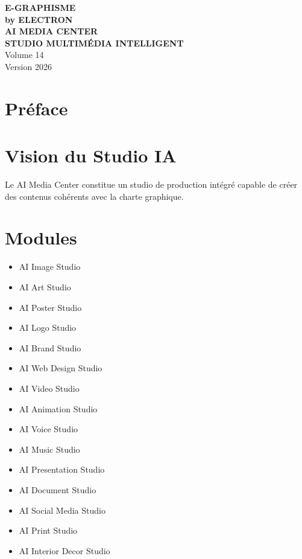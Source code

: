 \documentclass[12pt,a4paper,oneside]{book}
\begin{document}
\begin{titlepage}
\begin{center}
\vspace*{3cm}
{\Huge\bfseries\color{bleuIA}E-GRAPHISME}\\[0.3cm]
{\LARGE\bfseries\color{violet}by ELECTRON}\\[2cm]
{\huge\bfseries AI MEDIA CENTER}\\[0.3cm]
{\huge\bfseries STUDIO MULTIMÉDIA INTELLIGENT}\\[1cm]
{\Large Volume 14}\\[3cm]
{\Large Version 2026}
\end{center}
\end{titlepage}

\chapter*{Préface}

\chapter{Vision du Studio IA}
Le AI Media Center constitue un studio de production intégré capable de créer des contenus cohérents avec la charte graphique.

\chapter{Modules}
\begin{itemize}
\item AI Image Studio
\item AI Art Studio
\item AI Poster Studio
\item AI Logo Studio
\item AI Brand Studio
\item AI Web Design Studio
\item AI Video Studio
\item AI Animation Studio
\item AI Voice Studio
\item AI Music Studio
\item AI Presentation Studio
\item AI Document Studio
\item AI Social Media Studio
\item AI Print Studio
\item AI Interior Decor Studio
\end{itemize}
\end{document}
